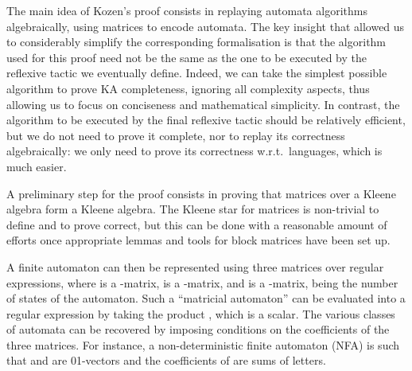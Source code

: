 \documentclass[a4paper]{llncs}
\begin{document}
The main idea of Kozen's proof consists in replaying automata
algorithms algebraically, using matrices to encode automata. The key
insight that allowed us to considerably simplify the corresponding
formalisation is that the algorithm used for this proof need not be
the same as the one to be executed by the reflexive tactic we
eventually define.
Indeed, we can take the simplest possible algorithm to prove KA
completeness, ignoring all complexity aspects, thus allowing us to
focus on conciseness and mathematical simplicity. 
In contrast, the algorithm to be executed by the final reflexive
tactic should be relatively efficient, but we do not need to prove it
complete, nor to replay its correctness algebraically: we only need
to prove its correctness w.r.t.\ languages, which is much
easier. 


\medskip

A preliminary step for the proof consists in proving that matrices
over a Kleene algebra form a Kleene algebra. The Kleene star for
matrices is non-trivial to define and to prove correct, but this can
be done with a reasonable amount of efforts once appropriate lemmas
and tools for block matrices have been set up.

A finite automaton can then be represented using three matrices
 over regular expressions, where  is a -matrix, 
is a -matrix, and  is a -matrix,  being the number
of states of the automaton. Such a ``matricial automaton'' can be
evaluated into a regular expression by taking the product , which is a scalar. The various classes of automata
can be recovered by imposing conditions on the coefficients of the
three matrices. For instance, a non-deterministic finite automaton
(NFA) is such that  and  are 01-vectors and the coefficients of
 are sums of letters.

\medskip
\end{document}
